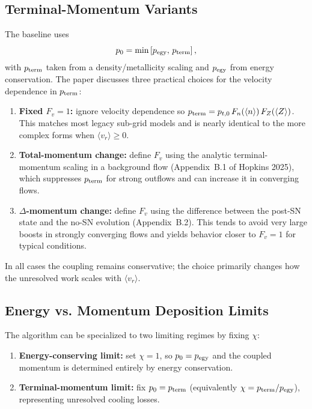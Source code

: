 \documentclass[11pt]{article}
\begin{document}
\subsection{Terminal-Momentum Variants}
The baseline uses
\begin{equation}
p_{0} = \min\left[p_{\rm egy},\,p_{\rm term}\right],
\end{equation}
with $p_{\rm term}$ taken from a density/metallicity scaling and $p_{\rm egy}$
from energy conservation. The paper discusses three practical choices for the
velocity dependence in $p_{\rm term}$:
\begin{enumerate}
\item \textbf{Fixed $F_{v}=1$:} ignore velocity dependence so
$p_{\rm term} = p_{t,0}\,F_{n}(\langle n\rangle)\,F_{Z}(\langle Z\rangle)$.
This matches most legacy sub-grid models and is nearly identical to the more
complex forms when $\langle v_{r}\rangle \ge 0$.
\item \textbf{Total-momentum change:} define $F_{v}$ using the analytic
terminal-momentum scaling in a background flow (Appendix~B.1 of Hopkins 2025),
which suppresses $p_{\rm term}$ for strong outflows and can increase it in
converging flows.
\item \textbf{$\Delta$-momentum change:} define $F_{v}$ using the difference
between the post-SN state and the no-SN evolution (Appendix~B.2). This tends to
avoid very large boosts in strongly converging flows and yields behavior closer
to $F_{v}=1$ for typical conditions.
\end{enumerate}
In all cases the coupling remains conservative; the choice primarily changes
how the unresolved work scales with $\langle v_{r}\rangle$.

\subsection{Energy vs. Momentum Deposition Limits}
The algorithm can be specialized to two limiting regimes by fixing $\chi$:
\begin{enumerate}
\item \textbf{Energy-conserving limit:} set $\chi=1$, so
$p_{0}=p_{\rm egy}$ and the coupled momentum is determined entirely by
energy conservation.
\item \textbf{Terminal-momentum limit:} fix $p_{0}=p_{\rm term}$ (equivalently
$\chi=p_{\rm term}/p_{\rm egy}$), representing unresolved cooling losses.
\end{enumerate}
\end{document}

